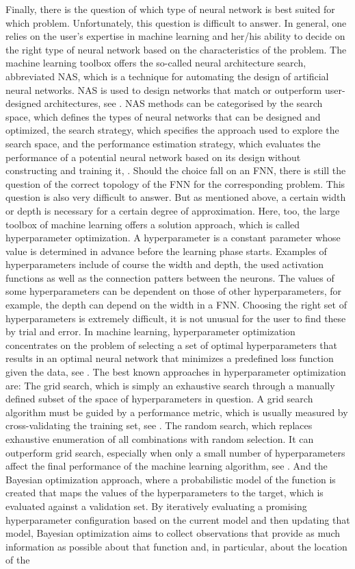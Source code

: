 Finally, there is the question of which type of neural network is best suited for which problem. Unfortunately, this question is difficult to answer. In general, one relies on the user's expertise in machine learning and her/his ability to decide on the right type of neural network based on the characteristics of the problem. The machine learning toolbox offers the so-called neural architecture search, abbreviated NAS, which is a technique for automating the design of artificial neural networks. NAS is used to design networks that match or outperform user-designed architectures, see \cite{ZophLe:2017}. NAS methods can be categorised by the search space, which defines the types of neural networks that can be designed and optimized, the search strategy, which specifies the approach used to explore the search space, and the performance estimation strategy, which evaluates the performance of a potential neural network based on its design without constructing and training it, \cite{ElskenMetzenHutter:2019}. Should the choice fall on an FNN, there is still the question of the correct topology of the FNN for the corresponding problem. This question is also very difficult to answer. But as mentioned above, a certain width or depth is necessary for a certain degree of approximation. Here, too, the large toolbox of machine learning offers a solution approach, which is called hyperparameter optimization. A hyperparameter is a constant parameter whose value is determined in advance before the learning phase starts. Examples of hyperparameters include of course the width and depth, the used activation functions as well as the connection patters between the neurons. The values of some hyperparameters can be dependent on those of other hyperparameters, for example, the depth can depend on the width in a FNN. Choosing the right set of hyperparameters is extremely difficult, it is not unusual for the user to find these by trial and error. In machine learning, hyperparameter optimization concentrates on the problem of selecting a set of optimal hyperparameters that results in an optimal neural network that minimizes a predefined loss function given the data, see \cite{ClaesenDeMoor:2015}. The best known approaches in hyperparameter optimization are: The grid search, which is simply an exhaustive search through a manually defined subset of the space of hyperparameters in question. A grid search algorithm must be guided by a performance metric, which is usually measured by cross-validating the training set, see \cite{HsuChangLin:2003}. The random search, which replaces exhaustive enumeration of all combinations with random selection. It can outperform grid search, especially when only a small number of hyperparameters affect the final performance of the machine learning algorithm, see \cite{BergstraBengio:2012}. And the Bayesian optimization approach, where a probabilistic model of the function is created that maps the values of the hyperparameters to the target, which is evaluated against a validation set. By iteratively evaluating a promising hyperparameter configuration based on the current model and then updating that model, Bayesian optimization aims to collect observations that provide as much information as possible about that function and, in particular, about the location of the 